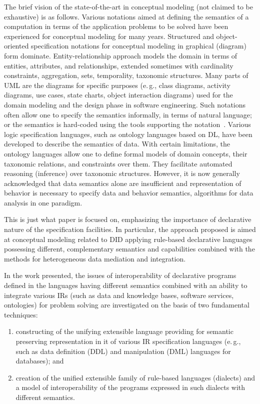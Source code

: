 \begin{multicols}{2}
  The brief vision of the state-of-the-art in conceptual modeling (not claimed to be
exhaustive) is as follows. Various notations aimed at defining the semantics of a
computation in terms of the application problems to be solved have been experienced
for conceptual modeling for many years. Structured and object-oriented specification
notations for conceptual modeling in graphical (diagram) form dominate.
  Entity-relationship approach models the domain in terms of entities, attributes,
and relationships, extended sometimes with cardinality constraints, aggregation, sets,
temporality, taxonomic structures. Many parts of UML are the diagrams for specific
purposes (e.\,g., class diagrams, activity diagrams, use cases, state charts, object
interaction diagrams) used for the domain modeling and the design phase in software
engineering. Such notations often allow one to specify the semantics informally, in
terms of natural language; or the semantics is hard-coded using the tools supporting
the notation~\cite{3-kal}. Various logic specification languages, such as ontology languages
based on DL, have been developed to describe the semantics of data.
With certain limitations, the ontology languages allow one to define formal models of
domain concepts, their taxonomic relations, and constraints over them. They facilitate
automated reasoning (inference) over taxonomic structures. However, it is now
generally acknowledged that data semantics alone are insufficient and representation
of behavior is necessary to specify data and behavior semantics, algorithms for data
analysis in one paradigm.
{

}

  This is just what paper is focused on, emphasizing the importance of declarative
nature of the specification facilities. In particular, the approach proposed is aimed at
conceptual modeling related to DID applying rule-based declarative languages
possessing different, complementary semantics and capabilities combined with the
methods for heterogeneous data mediation and integration.

  In the work presented, the issues of interoperability of declarative programs defined
in the languages having different semantics combined with an ability to integrate
various IRs (such as data and knowledge bases, software services,
ontologies) for problem solving are investigated on the basis of two fundamental
techniques:\begin{enumerate}[(1)]
\item constructing of the unifying extensible language providing for
semantic preserving representation in it of various IR
specification languages (e.\,g., such as data definition (DDL) and manipulation (DML)
languages for databases);  and
\item creation of
the unified extensible family of rule-based languages (dialects) and a model of
interoperability of the programs expressed in such dialects with different semantics.
\end{enumerate}


\end{multicols}
